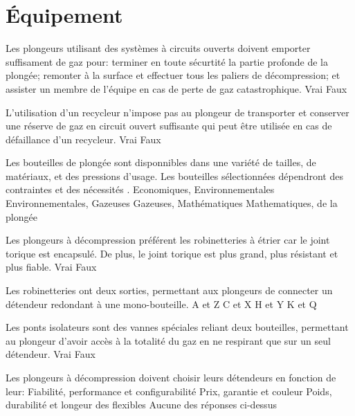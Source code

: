 \documentclass[english,12pt,a4paper]{article}
\begin{document}
	\section{Équipement}

	\begin{outline}
		\1 Les plongeurs utilisant des systèmes à circuits ouverts doivent emporter suffisament de gaz pour: terminer en toute sécurtité la partie profonde de la plongée; remonter à la surface et effectuer tous les paliers de décompression; et assister un membre de l'équipe en cas de perte de gaz catastrophique.
			\2 Vrai
			\2 Faux

		\1 L'utilisation d'un recycleur n'impose pas au plongeur de transporter et conserver une réserve de gaz en circuit ouvert suffisante qui peut être utilisée en cas de défaillance d'un recycleur.
			\2 Vrai
			\2 Faux

		\1 Les bouteilles de plongée sont disponnibles dans une variété de tailles, de matériaux, et des pressions d'usage. Les bouteilles sélectionnées dépendront des contraintes \underline{\hspace{1.5cm}} et des nécessités \underline{\hspace{1.5cm}}.
			\2 Economiques, Environnementales
			\2 Environnementales, Gazeuses
			\2 Gazeuses, Mathématiques
			\2 Mathematiques, de la plongée

		\1 Les plongeurs à décompression préférent les robinetteries à étrier car le joint torique est encapsulé. De plus, le joint torique est plus grand, plus résistant et plus fiable.
			\2 Vrai
			\2 Faux

		\1 Les robinetteries \underline{\hspace{1.5cm}} ont deux sorties, permettant aux plongeurs de connecter un détendeur redondant à une mono-bouteille.
			\2 A et Z
			\2 C et X
			\2 H et Y
			\2 K et Q 

		\1 Les ponts isolateurs sont des vannes spéciales reliant deux bouteilles, permettant au plongeur d'avoir accès à la totalité du gaz en ne respirant que sur un seul détendeur.
			\2 Vrai
			\2 Faux

		\1 Les plongeurs à décompression doivent choisir leurs détendeurs en fonction de leur:
			\2 Fiabilité, performance et configurabilité
			\2 Prix, garantie et couleur
			\2 Poids, durabilité et longeur des flexibles
			\2 Aucune des réponses ci-dessus


\end{outline}
\end{document}
